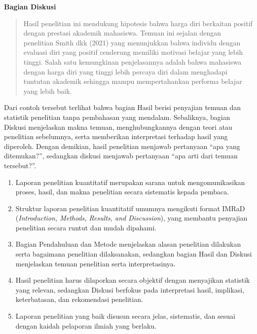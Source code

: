 \documentclass[
  indonesian,
  letterpaper,
  DIV=11,
  numbers=noendperiod]{scrreprt}
\providecommand{\tightlist}{%
  \setlength{\itemsep}{0pt}\setlength{\parskip}{0pt}}
\begin{document}
\textbf{Bagian Diskusi}

\begin{quote}
Hasil penelitian ini mendukung hipotesis bahwa harga diri berkaitan
positif dengan prestasi akademik mahasiswa. Temuan ini sejalan dengan
penelitian Smith dkk (2021) yang menunjukkan bahwa individu dengan
evaluasi diri yang positif cenderung memiliki motivasi belajar yang
lebih tinggi. Salah satu kemungkinan penjelasannya adalah bahwa
mahasiswa dengan harga diri yang tinggi lebih percaya diri dalam
menghadapi tuntutan akademik sehingga mampu mempertahankan performa
belajar yang lebih baik.
\end{quote}

Dari contoh tersebut terlihat bahwa bagian Hasil berisi penyajian temuan
dan statistik penelitian tanpa pembahasan yang mendalam. Sebaliknya,
bagian Diskusi menjelaskan makna temuan, menghubungkannya dengan teori
atau penelitian sebelumnya, serta memberikan interpretasi terhadap hasil
yang diperoleh. Dengan demikian, hasil penelitian menjawab pertanyaan
``apa yang ditemukan?'', sedangkan diskusi menjawab pertanyaan ``apa
arti dari temuan tersebut?''.

\begin{tcolorbox}[enhanced jigsaw, colframe=quarto-callout-tip-color-frame, toptitle=1mm, breakable, leftrule=.75mm, arc=.35mm, toprule=.15mm, colback=white, colbacktitle=quarto-callout-tip-color!10!white, bottomtitle=1mm, bottomrule=.15mm, titlerule=0mm, title=\textcolor{quarto-callout-tip-color}{\faLightbulb}\hspace{0.5em}{Rangkuman}, coltitle=black, left=2mm, opacitybacktitle=0.6, opacityback=0, rightrule=.15mm]

\begin{enumerate}
\def\labelenumi{\arabic{enumi}.}
\tightlist
\item
  Laporan penelitian kuantitatif merupakan sarana untuk mengomunikasikan
  proses, hasil, dan makna penelitian secara sistematis kepada pembaca.
\item
  Struktur laporan penelitian kuantitatif umumnya mengikuti format IMRaD
  (\emph{Introduction, Methods, Results, and Discussion}), yang membantu
  penyajian penelitian secara runtut dan mudah dipahami.
\item
  Bagian Pendahuluan dan Metode menjelaskan alasan penelitian dilakukan
  serta bagaimana penelitian dilaksanakan, sedangkan bagian Hasil dan
  Diskusi menjelaskan temuan penelitian serta interpretasinya.
\item
  Hasil penelitian harus dilaporkan secara objektif dengan menyajikan
  statistik yang relevan, sedangkan Diskusi berfokus pada interpretasi
  hasil, implikasi, keterbatasan, dan rekomendasi penelitian.
\item
  Laporan penelitian yang baik disusun secara jelas, sistematis, dan
  sesuai dengan kaidah pelaporan ilmiah yang berlaku.
\end{enumerate}

\end{tcolorbox}
\end{document}
